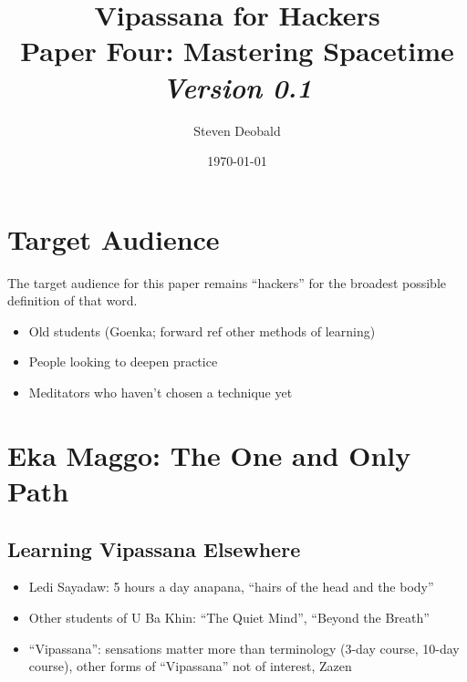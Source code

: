 \documentclass[a4paper, amsfonts, amssymb, amsmath, reprint, showkeys, nofootinbib, twoside]{revtex4-1}
\begin{document}
\title{%
  \large{Vipassana for Hackers} \\
  \Huge{Paper Four: Mastering Spacetime} \\
  \large\textit{Version 0.1}
}
\author{Steven Deobald}
\date{\today}

\begin{abstract}
\end{abstract}


\maketitle

\section{Target Audience}

The target audience for this paper remains ``hackers'' for the broadest possible
definition of that word. 

\begin{itemize}
  \item Old students (Goenka; forward ref other methods of learning)
  \item People looking to deepen practice
  \item Meditators who haven't chosen a technique yet
\end{itemize}


\section{Eka Maggo: The One and Only Path}

\subsection{Learning Vipassana Elsewhere}

\begin{itemize}
  \item Ledi Sayadaw: 5 hours a day anapana, ``hairs of the head and the body''
  \item Other students of U Ba Khin: ``The Quiet Mind'', ``Beyond the Breath''
  \item ``Vipassana'': sensations matter more than terminology (3-day course, 10-day course), other forms of ``Vipassana'' not of interest, Zazen
\end{itemize}
\end{document}
